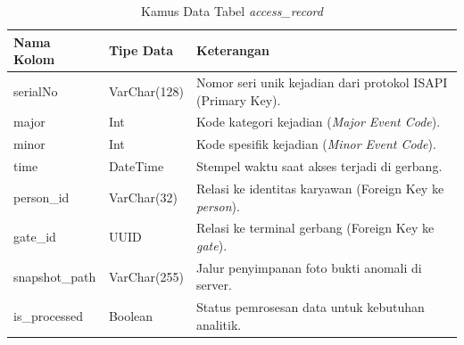 \begin{table}[t]
    \centering
    \caption{Kamus Data Tabel \textit{access\_record}}
    \label{tab:kamus_access_record}
    \begin{tabular}{|l|l|p{8cm}|}
        \hline
        \textbf{Nama Kolom} & \textbf{Tipe Data} & \textbf{Keterangan} \\
        \hline
        serialNo & VarChar(128) & Nomor seri unik kejadian dari protokol ISAPI (Primary Key). \\
        \hline
        major & Int & Kode kategori kejadian (\textit{Major Event Code}). \\
        \hline
        minor & Int & Kode spesifik kejadian (\textit{Minor Event Code}). \\
        \hline
        time & DateTime & Stempel waktu saat akses terjadi di gerbang. \\
        \hline
        person\_id & VarChar(32) & Relasi ke identitas karyawan (Foreign Key ke \textit{person}). \\
        \hline
        gate\_id & UUID & Relasi ke terminal gerbang (Foreign Key ke \textit{gate}). \\
        \hline
        snapshot\_path & VarChar(255) & Jalur penyimpanan foto bukti anomali di server. \\
        \hline
        is\_processed & Boolean & Status pemrosesan data untuk kebutuhan analitik. \\
        \hline
    \end{tabular}
\end{table}